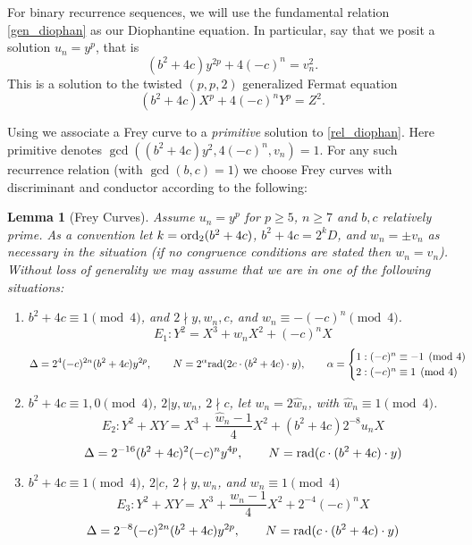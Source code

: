 \documentclass[12pt]{amsart}
\newtheorem{lem}[thm]{Lemma}
\theoremstyle{definition}
\newcommand{\rad}{{\rm{rad}}}
\newcommand{\notdiv}{\nmid}
\newcommand{\ord}{{\rm{ord}}}
\begin{document}
For binary recurrence sequences, we will use the fundamental relation \eqref{gen_diophan} as our Diophantine equation.  In particular, say that we posit a solution $u_n = y^p$, that is
\begin{equation}\label{rel_diophan} (b^2+4c)y^{2p}+4(-c)^n = v_n^2 .\end{equation}
This is a solution to the twisted $(p,p,2)$ generalized Fermat equation
\[ (b^2+4c)X^p +4(-c)^nY^p = Z^2. \]

Using \cite{bennett04} we associate a Frey curve to a \textit{primitive} solution to \eqref{rel_diophan}.  Here primitive denotes $\gcd((b^2+4c)y^2, 4(-c)^n, v_n ) = 1$.  For any such recurrence relation (with $\gcd(b,c)=1$) we choose Frey curves with discriminant and conductor according to the following:

\begin{lem}[Frey Curves]\label{freycurves}
Assume $u_n = y^p$ for $p\geq 5$, $n \geq 7$ and $b,c$ relatively prime.  As a convention let $k = \ord_2(b^2+4c)$,  $b^2+4c = 2^kD$, and $w_n = \pm v_n$ as necessary in the situation (if no congruence conditions are stated then $w_n = v_n$).  Without loss of generality we may assume that we are in one of the following situations:



\begin{enumerate}[1.]

\item $b^2+4c \equiv 1 \pmod{4}$, and $2 \notdiv y,w_n,c$, and $w_n \equiv -(-c)^n \pmod{4}$.
\[ E_1: Y^2 = X^3 + w_nX^2 + (-c)^nX \]
\[ \Delta = 2^4(-c)^{2n}(b^2+4c)y^{2p},  \qquad N = 2^{\alpha} \rad(2c \cdot (b^2+4c) \cdot y), \qquad \alpha =  \begin{cases} 1: (-c)^n \equiv -1 \pmod{4}\\ 2 : (-c)^n \equiv 1 \pmod{4} \end{cases} \]

\item $b^2+4c \equiv 1,0 \pmod{4}$, $2|y,w_n$, $2 \notdiv c$, let $w_n = 2\hat{w}_n$, with $\hat{w}_n \equiv 1 \pmod{4}$.
\[ E_{2} : Y^2 +XY = X^3 + \frac{\hat{w}_n - 1}{4} X^2 + (b^2+4c)2^{-8}u_nX \]
\[ \Delta = 2^{-16}(b^2+4c)^2(-c)^ny^{4p}, \qquad N = \rad( c \cdot (b^2+4c)\cdot y)  \]

\item $b^2+4c \equiv 1 \pmod{4}$, $2|c$, $2 \notdiv y,w_n$, and $w_n \equiv 1 \pmod{4}$
\[ E_{3}: Y^2 +XY = X^3 +\frac{w_n-1}{4}X^2 +2^{-4}(-c)^nX \]
\[ \Delta = 2^{-8}(-c)^{2n}(b^2+4c)y^{2p} , \qquad N =\rad( c \cdot (b^2+4c)\cdot y)  \]


\end{enumerate}
\end{lem}
\end{document}
